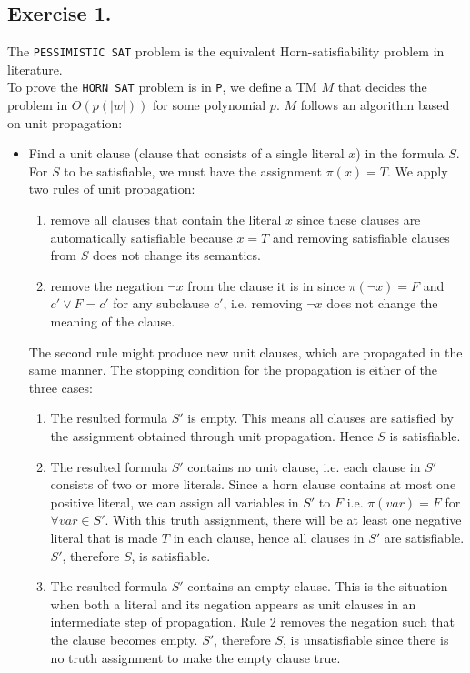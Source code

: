 \documentclass[12pt]{article}
\newcommand{\code}{\texttt}
\begin{document}
\subsection*{Exercise 1.}
The \code{PESSIMISTIC SAT} problem is the equivalent Horn-satisfiability problem in literature.\\
To prove the \code{HORN SAT} problem is in \code{P}, we define a TM \(M\) that decides the problem in \(O(p(|w|))\) for some polynomial \(p\). \(M\) follows an algorithm based on unit propagation:
\begin{itemize}
  \item Find a unit clause (clause that consists of a single literal \(x\)) in the formula \(S\). For \(S\) to be satisfiable, we must have the assignment \(\pi(x) = T\). We apply two rules of unit propagation:
  \begin{enumerate}
    \item remove all clauses that contain the literal \(x\) since these clauses are automatically satisfiable because \(x = T\) and removing satisfiable clauses from \(S\) does not change its semantics.
    \item remove the negation \(\neg x\) from the clause it is in since \(\pi(\neg x) = F\) and \(c' \lor F = c'\) for any subclause \(c'\), i.e. removing \(\neg x\) does not change the meaning of the clause.
  \end{enumerate} 
  The second rule might produce new unit clauses, which are propagated in the same manner. The stopping condition for the propagation is either of the three cases:
  \begin{enumerate}
    \item The resulted formula \(S'\) is empty. This means all clauses are satisfied by the assignment obtained through unit propagation. Hence \(S\) is satisfiable.
    \item The resulted formula \(S'\) contains no unit clause, i.e. each clause in \(S'\) consists of two or more literals. Since a horn clause contains at most one positive literal, we can assign all variables in \(S'\) to \(F\) i.e. \(\pi(var) = F\) for \(\forall var \in S'\). With this truth assignment, there will be at least one negative literal that is made \(T\) in each clause, hence all clauses in \(S'\) are satisfiable. \(S'\), therefore \(S\), is satisfiable.
    \item The resulted formula \(S'\) contains an empty clause. This is the situation when both a literal and its negation appears as unit clauses in an intermediate step of propagation. Rule 2 removes the negation such that the clause becomes empty. \(S'\), therefore \(S\), is unsatisfiable since there is no truth assignment to make the empty clause true.
  \end{enumerate}
\end{itemize}
\end{document}
